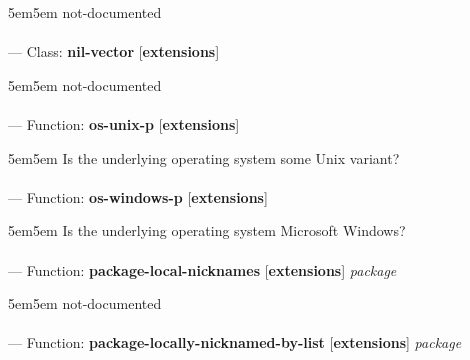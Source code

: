 \begin{adjustwidth}{5em}{5em}
not-documented
\end{adjustwidth}

\paragraph{}
\label{EXTENSIONS:NIL-VECTOR}
--- Class: \textbf{nil-vector} [\textbf{extensions}] \textit{}

\begin{adjustwidth}{5em}{5em}
not-documented
\end{adjustwidth}

\paragraph{}
\label{EXTENSIONS:OS-UNIX-P}
--- Function: \textbf{os-unix-p} [\textbf{extensions}] \textit{}

\begin{adjustwidth}{5em}{5em}
Is the underlying operating system some Unix variant?
\end{adjustwidth}

\paragraph{}
\label{EXTENSIONS:OS-WINDOWS-P}
--- Function: \textbf{os-windows-p} [\textbf{extensions}] \textit{}

\begin{adjustwidth}{5em}{5em}
Is the underlying operating system Microsoft Windows?
\end{adjustwidth}

\paragraph{}
\label{EXTENSIONS:PACKAGE-LOCAL-NICKNAMES}
--- Function: \textbf{package-local-nicknames} [\textbf{extensions}] \textit{package}

\begin{adjustwidth}{5em}{5em}
not-documented
\end{adjustwidth}

\paragraph{}
\label{EXTENSIONS:PACKAGE-LOCALLY-NICKNAMED-BY-LIST}
--- Function: \textbf{package-locally-nicknamed-by-list} [\textbf{extensions}] \textit{package}

